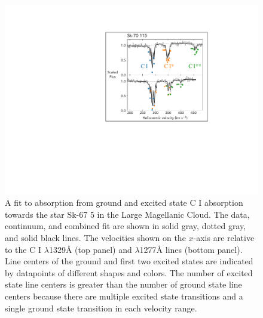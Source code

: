 \documentclass[trackchanges]{aastex62}
\begin{document}
\begin{figure}
  \centering
  \includegraphics{annotated-SK-675.pdf}
  \caption{
  A fit to absorption from ground and excited state {C \small{I}} absorption towards the star Sk-67 5 in the Large Magellanic Cloud.
  The data, continuum, and combined fit are shown in solid gray, dotted gray, and solid black lines.
  The velocities shown on the $x$-axis are relative to the {C \small{I}} $\lambda$1329\AA{} (top panel) and $\lambda$1277\AA{} lines (bottom panel).
  Line centers of the ground and first two excited states are indicated by datapoints of different shapes and colors.
  The number of excited state line centers is greater than the number of ground state line centers because there are multiple excited state transitions and a single ground state transition in each velocity range.
  }
  \label{fig:demonstration-fit}
\end{figure}
\end{document}
